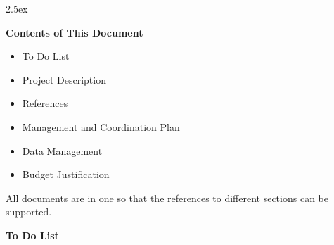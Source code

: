 \documentclass[11pt]{NSFamsart}
\begin{document}
\leftmargini2.5ex %
\centerline{\Large \textbf{Contents of This Document}}
\bigskip
\begin{itemize}
\item To Do List
\item Project Description
\item References
\item Management and Coordination Plan
\item Data Management
\item Budget Justification
\end{itemize}

All documents are in one so that the references to different sections can be supported.

\newpage \setcounter{page}{1} %

\centerline{\Large \textbf{To Do List}}
\bigskip
\end{document}
